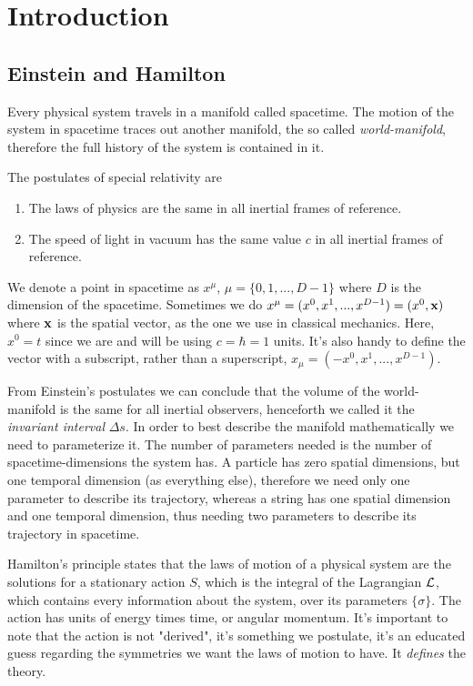 \documentclass[oneside, 12pt, notitlepage]{book}
\begin{document}
\pagestyle{mynotespage} %

\chapter{Introduction}

\section{Einstein and Hamilton}

Every physical system travels in a manifold called spacetime. The motion of the system in spacetime traces out another manifold, the so called \textit{world-manifold}, therefore the full history of the system is contained in it. \par

The postulates of special relativity are
\begin{enumerate}
    \item The laws of physics are the same in all inertial frames of reference.
    \item The speed of light in vacuum has the same value \(c\) in all inertial frames of reference.
\end{enumerate}
We denote a point in spacetime as \( x^{\mu}\), \(\mu = \{0,1,...,D-1\} \) where \(D\) is the dimension of the spacetime. Sometimes we do \( x^{\mu } = (x^0,x^1,...,x^{D-1}) = (x^0,\vb{x})\) where \(\vb{x}\) is the spatial vector, as the one we use in classical mechanics. Here, \( x^0 = t\) since we are and will be using \(c = \hbar = 1\) units. It's also handy to define the vector with a subscript, rather than a superscript, \( x_{\mu} = (- x^0,x^1,...,x^{D-1})\).\par

From Einstein's postulates we can conclude that the volume of the world-manifold is the same for all inertial observers, henceforth we called it the \textit{invariant interval} \(\Delta s \). In order to best describe the manifold mathematically we need to parameterize it. The number of parameters needed is the number of spacetime-dimensions the system has. A particle has zero spatial dimensions, but one temporal dimension (as everything else), therefore we need only one parameter to describe its trajectory, whereas a string has one spatial dimension and one temporal dimension, thus needing two parameters to describe its trajectory in spacetime.\par

Hamilton's principle states that the laws of motion of a physical system are the solutions for a stationary action \(S\), which is the integral of the Lagrangian \(\mathcal{L}\), which contains every information about the system, over its parameters \(\{\sigma\}\). The action has units of energy times time, or angular momentum. It's important to note that the action is not "derived", it's something we postulate, it's an educated guess regarding the symmetries we want the laws of motion to have. It \textit{defines} the theory.\par
\end{document}
